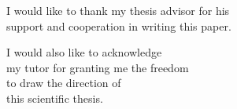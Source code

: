 \vspace*{7cm}
\begin{center}
I would like to thank my thesis advisor for his\\
support and cooperation in writing this paper.
\end{center}
\vspace{0.6cm}
\begin{center}
I would also like to acknowledge\\
my tutor for granting me the freedom\\
to draw the direction of\\
this scientific thesis.
\end{center}

